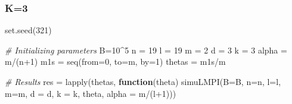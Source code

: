 \documentclass[
]{article}
\newenvironment{Shaded}{\begin{snugshade}}{\end{snugshade}}
\newcommand{\AttributeTok}[1]{\textcolor[rgb]{0.77,0.63,0.00}{#1}}
\newcommand{\CommentTok}[1]{\textcolor[rgb]{0.56,0.35,0.01}{\textit{#1}}}
\newcommand{\ControlFlowTok}[1]{\textcolor[rgb]{0.13,0.29,0.53}{\textbf{#1}}}
\newcommand{\DecValTok}[1]{\textcolor[rgb]{0.00,0.00,0.81}{#1}}
\newcommand{\FunctionTok}[1]{\textcolor[rgb]{0.00,0.00,0.00}{#1}}
\newcommand{\NormalTok}[1]{#1}
\newcommand{\OtherTok}[1]{\textcolor[rgb]{0.56,0.35,0.01}{#1}}
\newcommand{\SpecialCharTok}[1]{\textcolor[rgb]{0.00,0.00,0.00}{#1}}
\begin{document}
\hypertarget{k3}{%
\subsubsection{K=3}\label{k3}}

\begin{Shaded}
\begin{Highlighting}[]
\FunctionTok{set.seed}\NormalTok{(}\DecValTok{321}\NormalTok{)}

\CommentTok{\# Initializing parameters}
\NormalTok{B}\OtherTok{=}\DecValTok{10}\SpecialCharTok{\^{}}\DecValTok{5}
\NormalTok{n }\OtherTok{=} \DecValTok{19}
\NormalTok{l }\OtherTok{=} \DecValTok{19}
\NormalTok{m }\OtherTok{=} \DecValTok{2}
\NormalTok{d }\OtherTok{=} \DecValTok{3}
\NormalTok{k }\OtherTok{=} \DecValTok{3}
\NormalTok{alpha }\OtherTok{=}\NormalTok{ m}\SpecialCharTok{/}\NormalTok{(n}\SpecialCharTok{+}\DecValTok{1}\NormalTok{)}
\NormalTok{m1s }\OtherTok{=} \FunctionTok{seq}\NormalTok{(}\AttributeTok{from=}\DecValTok{0}\NormalTok{, }\AttributeTok{to=}\NormalTok{m, }\AttributeTok{by=}\DecValTok{1}\NormalTok{)}
\NormalTok{thetas }\OtherTok{=}\NormalTok{ m1s}\SpecialCharTok{/}\NormalTok{m}

\CommentTok{\# Results}
\NormalTok{res }\OtherTok{=} \FunctionTok{lapply}\NormalTok{(thetas, }\ControlFlowTok{function}\NormalTok{(theta) }\FunctionTok{simuLMPI}\NormalTok{(}\AttributeTok{B=}\NormalTok{B, }\AttributeTok{n=}\NormalTok{n, }\AttributeTok{l=}\NormalTok{l, }\AttributeTok{m=}\NormalTok{m, }\AttributeTok{d =}\NormalTok{ d, }
                                              \AttributeTok{k =}\NormalTok{ k, theta, }\AttributeTok{alpha =}\NormalTok{ m}\SpecialCharTok{/}\NormalTok{(l}\SpecialCharTok{+}\DecValTok{1}\NormalTok{)))}


\end{Highlighting}
\end{Shaded}
\end{document}
